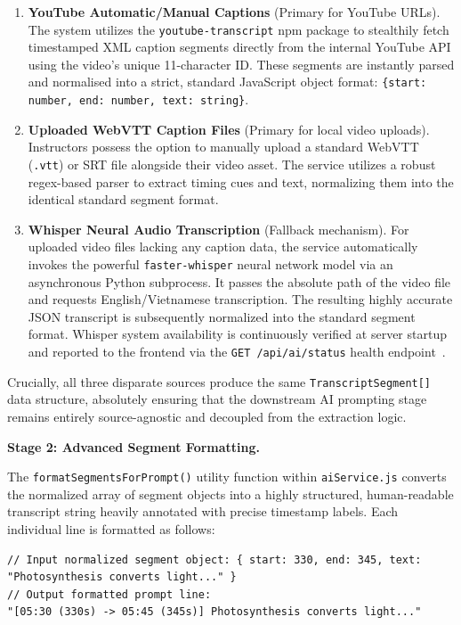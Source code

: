 \begin{enumerate}
  \item \textbf{YouTube Automatic/Manual Captions} (Primary for YouTube URLs). The system utilizes the \texttt{youtube-transcript} npm package to stealthily fetch timestamped XML caption segments directly from the internal YouTube API using the video's unique 11-character ID. These segments are instantly parsed and normalised into a strict, standard JavaScript object format: \texttt{\{start: number, end: number, text: string\}}.
  \item \textbf{Uploaded WebVTT Caption Files} (Primary for local video uploads). Instructors possess the option to manually upload a standard WebVTT (\texttt{.vtt}) or SRT file alongside their video asset. The service utilizes a robust regex-based parser to extract timing cues and text, normalizing them into the identical standard segment format.
  \item \textbf{Whisper Neural Audio Transcription} (Fallback mechanism). For uploaded video files lacking any caption data, the service automatically invokes the powerful \texttt{faster-whisper} neural network model via an asynchronous Python subprocess. It passes the absolute path of the video file and requests English/Vietnamese transcription. The resulting highly accurate JSON transcript is subsequently normalized into the standard segment format. Whisper system availability is continuously verified at server startup and reported to the frontend via the \texttt{GET /api/ai/status} health endpoint~\cite{radford2023}.
\end{enumerate}

Crucially, all three disparate sources produce the same \texttt{TranscriptSegment[]} data structure, absolutely ensuring that the downstream AI prompting stage remains entirely source-agnostic and decoupled from the extraction logic.

\textbf{Stage 2: Advanced Segment Formatting.}

The \texttt{formatSegmentsForPrompt()} utility function within \texttt{aiService.js} converts the normalized array of segment objects into a highly structured, human-readable transcript string heavily annotated with precise timestamp labels. Each individual line is formatted as follows:

\begin{lstlisting}[language={},caption={Advanced transcript segment formatting injecting raw-second timestamps}]
// Input normalized segment object: { start: 330, end: 345, text: "Photosynthesis converts light..." }
// Output formatted prompt line:
"[05:30 (330s) -> 05:45 (345s)] Photosynthesis converts light..."
\end{lstlisting}


